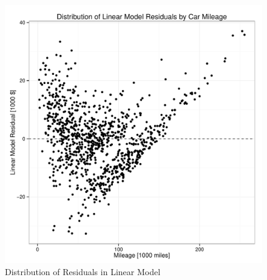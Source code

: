 \documentclass[11pt, fleqn]{article}
\begin{document}
\begin{figure}[!htb]
  \centering
  \includegraphics[scale=.5]{lin_errors.pdf}
  \caption{Distribution of Residuals in Linear Model}
  \label{fig:lin_errors}
\end{figure}
\end{document}
